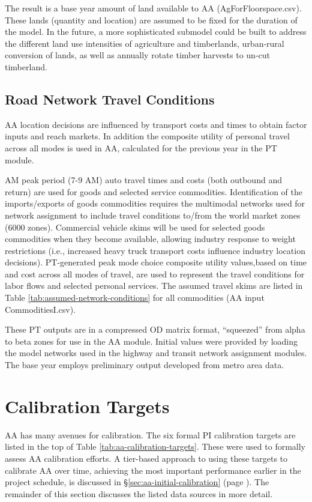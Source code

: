 The result is a base year amount of land available to AA (AgForFloorspace.csv). These lands (quantity and location) are assumed to be fixed for the duration of the model. In the future, a more sophisticated submodel could be built to address the different land use intensities of agriculture and timberlands, urban-rural conversion of lands, as well as annually rotate timber harvests to un-cut timberland.

\subsection{Road Network Travel Conditions}
AA location decisions are influenced by transport costs and times to obtain factor inputs and reach markets. In addition the composite utility of personal travel across all modes is used in AA, calculated for the previous year in the PT module. 

AM peak period (7-9 AM) auto travel times and costs (both outbound and return) are used for goods and selected service commodities. Identification of the imports/exports of goods commodities requires the multimodal networks used for network assignment to include travel conditions to/from the world market zones (6000 zones). Commercial vehicle skims will be used for selected goods commodities when they become available, allowing industry response to weight restrictions (i.e., increased heavy truck transport costs influence industry location decisions). PT-generated peak mode choice composite utility values,based on time and cost across all modes of travel, are used to represent the travel conditions for labor flows and selected personal services. The assumed travel skims are listed in Table \ref{tab:assumed-network-conditions} for all commodities (AA input CommoditiesI.csv).

These PT outputs are in a compressed OD matrix format, ``squeezed'' from alpha to beta zones for use in the AA module. Initial values were provided by loading the model networks used in the highway and transit network assignment modules. The base year employs preliminary output developed from metro area data. 



\section{Calibration Targets}

AA has many avenues for calibration. The six formal PI calibration targets are listed in the top of Table \ref{tab:aa-calibration-targets}. These were used to formally assess AA calibration efforts. A tier-based approach to using these targets to calibrate AA over time, achieving the most important performance earlier in the project schedule, is discussed in \S\ref{sec:aa-initial-calibration} (page \pageref{sec:aa-initial-calibration}). The remainder of this section discusses the listed data sources in more detail.

